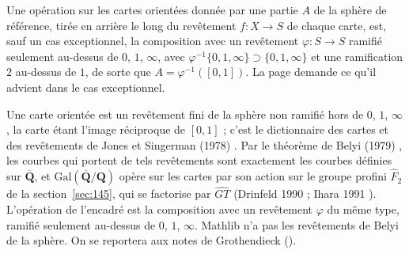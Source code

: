 \begin{encadre}
\begin{theoreme*}\nonverifie
Une opération sur les cartes orientées donnée par une partie $A$ de la sphère de référence, tirée en arrière le long du revêtement $f : X \to S$ de chaque carte, est, sauf un cas exceptionnel, la composition avec un revêtement $\varphi : S \to S$ ramifié seulement au-dessus de $0$, $1$, $\infty$, avec $\varphi^{-1}\{0, 1, \infty\} \supset \{0, 1, \infty\}$ et une ramification $2$ au-dessus de $1$, de sorte que $A = \varphi^{-1}([0, 1])$. La page demande ce qu'il advient dans le cas exceptionnel.
\end{theoreme*}
\end{encadre}
{\small Une carte orientée est un revêtement fini de la sphère non ramifié hors de $0$, $1$, $\infty$, la carte étant l'image réciproque de $[0, 1]$ ; c'est le dictionnaire des cartes et des revêtements de Jones et Singerman (1978) \cite{jonessingerman1978}. Par le théorème de Belyi (1979) \cite{belyi1979}, les courbes qui portent de tels revêtements sont exactement les courbes définies sur $\overline{\mathbf Q}$, et $\mathrm{Gal}(\overline{\mathbf Q}/\mathbf Q)$ opère sur les cartes par son action sur le groupe profini $\hat F_2$ de la section~\ref{sec:145}, qui se factorise par $\widehat{GT}$ (Drinfeld 1990 \cite{drinfeld1990} ; Ihara 1991 \cite{ihara1991}). L'opération de l'encadré est la composition avec un revêtement $\varphi$ du même type, ramifié seulement au-dessus de $0$, $1$, $\infty$. Mathlib n'a pas les revêtements de Belyi de la sphère. On se reportera aux notes de Grothendieck ().\par}
